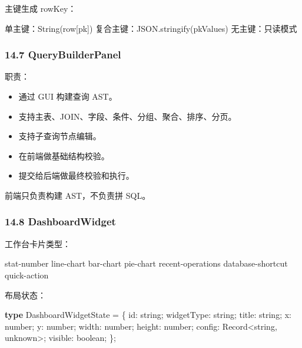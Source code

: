 \documentclass[
  a4paper,
  UTF8]{ctexart}
\newenvironment{Shaded}{}{}
\newcommand{\BuiltInTok}[1]{#1}
\newcommand{\DataTypeTok}[1]{\textcolor[rgb]{0.56,0.13,0.00}{#1}}
\newcommand{\KeywordTok}[1]{\textcolor[rgb]{0.00,0.44,0.13}{\textbf{#1}}}
\newcommand{\NormalTok}[1]{#1}
\newcommand{\OperatorTok}[1]{\textcolor[rgb]{0.40,0.40,0.40}{#1}}
\providecommand{\tightlist}{%
  \setlength{\itemsep}{0pt}\setlength{\parskip}{0pt}}
\begin{document}
主键生成 rowKey：

\begin{Shaded}
\begin{Highlighting}[]
\NormalTok{单主键：String(row[pk])}
\NormalTok{复合主键：JSON.stringify(pkValues)}
\NormalTok{无主键：只读模式}
\end{Highlighting}
\end{Shaded}

\hypertarget{querybuilderpanel}{%
\subsubsection{14.7 QueryBuilderPanel}\label{querybuilderpanel}}

职责：

\begin{itemize}
\tightlist
\item
  通过 GUI 构建查询 AST。
\item
  支持主表、JOIN、字段、条件、分组、聚合、排序、分页。
\item
  支持子查询节点编辑。
\item
  在前端做基础结构校验。
\item
  提交给后端做最终校验和执行。
\end{itemize}

前端只负责构建 AST，不负责拼 SQL。

\hypertarget{dashboardwidget}{%
\subsubsection{14.8 DashboardWidget}\label{dashboardwidget}}

工作台卡片类型：

\begin{Shaded}
\begin{Highlighting}[]
\NormalTok{stat{-}number}
\NormalTok{line{-}chart}
\NormalTok{bar{-}chart}
\NormalTok{pie{-}chart}
\NormalTok{recent{-}operations}
\NormalTok{database{-}shortcut}
\NormalTok{quick{-}action}
\end{Highlighting}
\end{Shaded}

布局状态：

\begin{Shaded}
\begin{Highlighting}[]
\KeywordTok{type}\NormalTok{ DashboardWidgetState }\OperatorTok{=}\NormalTok{ \{}
\NormalTok{  id}\OperatorTok{:} \DataTypeTok{string}\OperatorTok{;}
\NormalTok{  widgetType}\OperatorTok{:} \DataTypeTok{string}\OperatorTok{;}
\NormalTok{  title}\OperatorTok{:} \DataTypeTok{string}\OperatorTok{;}
\NormalTok{  x}\OperatorTok{:} \DataTypeTok{number}\OperatorTok{;}
\NormalTok{  y}\OperatorTok{:} \DataTypeTok{number}\OperatorTok{;}
\NormalTok{  width}\OperatorTok{:} \DataTypeTok{number}\OperatorTok{;}
\NormalTok{  height}\OperatorTok{:} \DataTypeTok{number}\OperatorTok{;}
\NormalTok{  config}\OperatorTok{:} \BuiltInTok{Record}\OperatorTok{\textless{}}\DataTypeTok{string}\OperatorTok{,} \DataTypeTok{unknown}\OperatorTok{\textgreater{};}
\NormalTok{  visible}\OperatorTok{:} \DataTypeTok{boolean}\OperatorTok{;}
\NormalTok{\}}\OperatorTok{;}
\end{Highlighting}
\end{Shaded}
\end{document}
